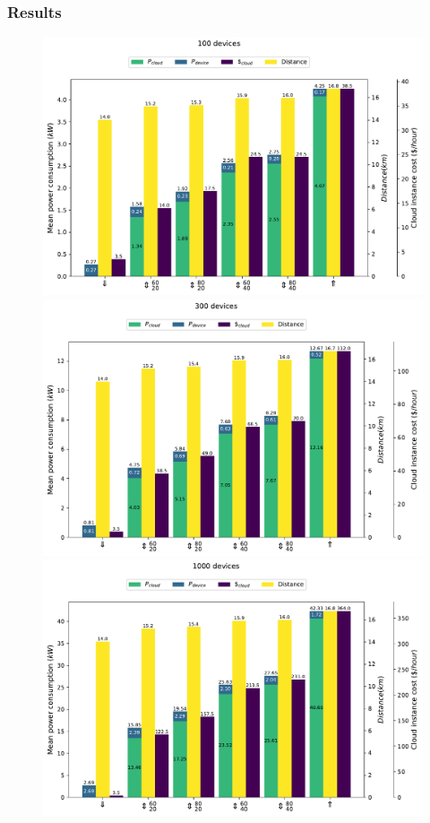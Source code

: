 \documentclass[conference]{IEEEtran}
\begin{document}
\subsubsection{Results}
%
\begin{figure}
    \includegraphics[width=\columnwidth]{figures/cloud_cost-device_consumption-cloud_consumption-distance-device=100.0.pdf}\\
    \includegraphics[width=\columnwidth]{figures/cloud_cost-device_consumption-cloud_consumption-distance-device=300.0.pdf}\\
    \includegraphics[width=\columnwidth]{figures/cloud_cost-device_consumption-cloud_consumption-distance-device=1000.0.pdf}

\end{figure}
\end{document}
